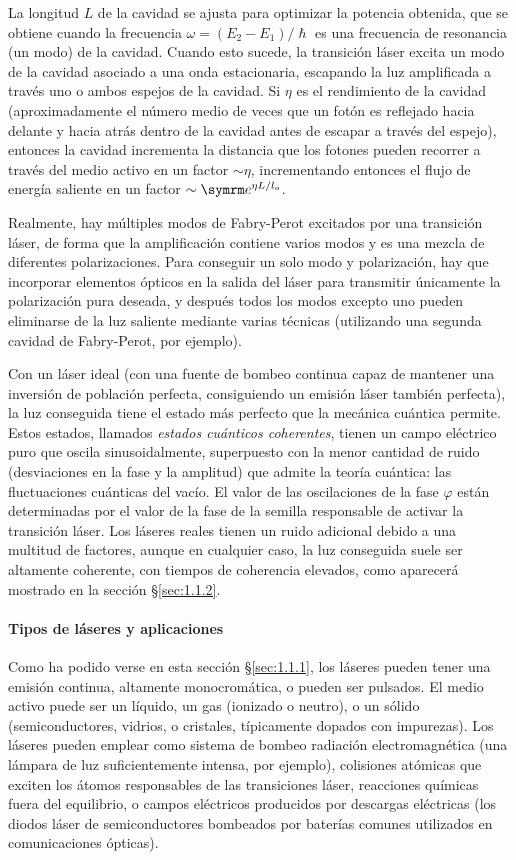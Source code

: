 La longitud $L$ de la cavidad se ajusta para optimizar la potencia obtenida, que se obtiene cuando la frecuencia $\omega = (E_{2}-E_{1})/\hslash $ es una frecuencia de resonancia (un modo) de la cavidad. Cuando esto sucede, la transición láser excita un modo de la cavidad asociado a una onda estacionaria, escapando la luz amplificada a través uno o ambos espejos de la cavidad. Si $\eta$ es el rendimiento de la cavidad (aproximadamente el número medio de veces que un fotón es reflejado hacia delante y hacia atrás dentro de la cavidad antes de escapar a través del espejo), entonces la cavidad incrementa la distancia que los fotones pueden recorrer a través del medio activo en un factor $\sim \eta$, incrementando entonces el flujo de energía saliente en un factor $\sim \eu^{\eta L/l_{o}}$.

Realmente, hay múltiples modos de Fabry-Perot excitados por una transición láser, de forma que la amplificación contiene varios modos y es una mezcla de diferentes polarizaciones. Para conseguir un solo modo y polarización, hay que incorporar elementos ópticos en la salida del láser para transmitir únicamente la polarización pura deseada, y después todos los modos excepto uno pueden eliminarse de la luz saliente mediante varias técnicas (utilizando una segunda cavidad de Fabry-Perot, por ejemplo).

Con un láser ideal (con una fuente de bombeo continua capaz de mantener una inversión de población perfecta, consiguiendo un emisión láser también perfecta), la luz conseguida tiene el estado más perfecto que la mecánica cuántica permite. Estos estados, llamados \emph{estados cuánticos coherentes}, tienen un campo eléctrico puro que oscila sinusoidalmente, superpuesto con la menor cantidad de ruido (desviaciones en la fase y la amplitud) que admite la teoría cuántica: las fluctuaciones cuánticas del vacío. El valor de las oscilaciones de la fase $\varphi$ están determinadas por el valor de la fase de la semilla responsable de activar la transición láser. Los láseres reales tienen un ruido adicional debido a una multitud de factores, aunque en cualquier caso, la luz conseguida suele ser altamente coherente, con tiempos de coherencia elevados, como aparecerá mostrado en la sección \S\ref{sec:1.1.2}.

\paragraph{Tipos de láseres y aplicaciones}
Como ha podido verse en esta sección \S\ref{sec:1.1.1}, los láseres pueden tener una emisión continua, altamente monocromática, o pueden ser pulsados. El medio activo puede ser un líquido, un gas (ionizado o neutro), o un sólido (semiconductores, vidrios, o cristales, típicamente dopados con impurezas). Los láseres pueden emplear como sistema de bombeo radiación electromagnética (una lámpara de luz suficientemente intensa, por ejemplo), colisiones atómicas que exciten los átomos responsables de las transiciones láser, reacciones químicas fuera del equilibrio, o campos eléctricos producidos por descargas eléctricas (los diodos láser de semiconductores bombeados por baterías comunes utilizados en comunicaciones ópticas).

